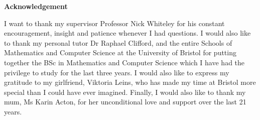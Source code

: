 \thispagestyle{plain}
\mbox{}
\vspace{60mm}
\begin{center}
    \textbf{Acknowledgement}
\end{center}
I want to thank my supervisor Professor Nick Whiteley for his constant encouragement, 
insight and patience whenever I had questions. I would also like to thank my personal tutor Dr Raphael Clifford, 
and the entire Schools of Mathematics and Computer Science at the University of Bristol for putting together the 
BSc in Mathematics and Computer Science which I have had the privilege to study for the last three years.
\newline\newline
I would also like to express my gratitude to my girlfriend, Viktoria Leins, 
who has made my time at Bristol more special than I could have ever imagined. 
Finally, I would also like to thank my mum, Ms Karin Acton, for her unconditional 
love and support over the last 21 years.
\newpage